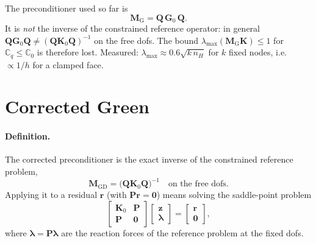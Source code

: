 \documentclass[11pt,a4paper]{article}
\begin{document}
The preconditioner used so far is
\[
  \mathbf{M}_{\mathrm{G}} = \mathbf{Q}\,\mathbf{G}_0\,\mathbf{Q}.
\]
It is \emph{not} the inverse of the constrained reference operator: in general
$\mathbf{Q}\mathbf{G}_0\mathbf{Q} \neq (\mathbf{Q}\mathbf{K}_0\mathbf{Q})^{-1}$ on the free dofs. The bound
$\lambda_{\max}(\mathbf{M}_{\mathrm{G}}\mathbf{K}) \le 1$ for $\mathbb{C}_q \le \mathbb{C}_0$ is therefore lost. Measured:
$\lambda_{\max} \approx 0.6\sqrt{k\,n_H}$ for $k$ fixed nodes, i.e.\ $\propto 1/h$ for a clamped face.

\section*{Corrected Green}

\paragraph{Definition.} The corrected preconditioner is the exact inverse of the constrained reference problem,
\[
  \mathbf{M}_{\mathrm{GD}} = \bigl(\mathbf{Q}\mathbf{K}_0\mathbf{Q}\bigr)^{-1} \quad \text{on the free dofs}.
\]
Applying it to a residual $\mathbf{r}$ (with $\mathbf{P}\mathbf{r} = \mathbf{0}$) means solving the saddle-point problem
\[
  \begin{bmatrix} \mathbf{K}_0 & \mathbf{P} \\ \mathbf{P} & \mathbf{0} \end{bmatrix}
  \begin{bmatrix} \mathbf{z} \\ \boldsymbol{\lambda} \end{bmatrix}
  =
  \begin{bmatrix} \mathbf{r} \\ \mathbf{0} \end{bmatrix},
\]
where $\boldsymbol{\lambda} = \mathbf{P}\boldsymbol{\lambda}$ are the reaction forces of the reference problem at the fixed dofs.
\end{document}
